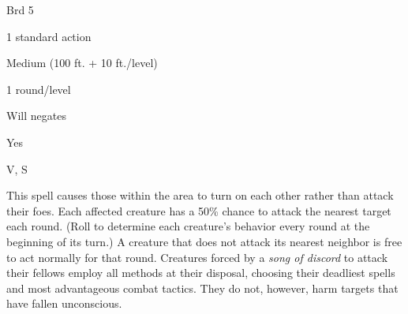 
\begin{description*}
\item[Level:] Brd 5
\item[Casting Time:] 1 standard action
\item[Range:] Medium (100 ft. + 10 ft./level)
\item[Duration:] 1 round/level
\item[Saving Throw:] Will negates
\item[Spell Resistance:] Yes
\item[Components:] V, S
\end{description*}

This spell causes those within the area to turn on each other rather than attack
their foes. Each affected creature has a 50\% chance to attack the nearest target
each round. (Roll to determine each creature's behavior every round at the beginning
of its turn.) A creature that does not attack its nearest neighbor is free to act
normally for that round.
Creatures forced by a \textit{song of discord} to attack their fellows employ all
methods at their disposal, choosing their deadliest spells and most advantageous
combat tactics. They do not, however, harm targets that have fallen unconscious.
